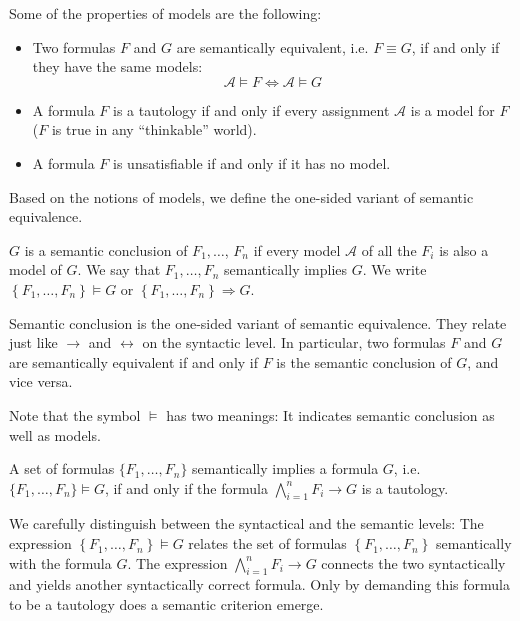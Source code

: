 Some of the properties of models are the following:
\begin{itemize}
  \item Two formulas \(F\) and \(G\) are semantically equivalent, i.e. \(F \equiv G\), if and only if they have the same models: \[\mathcal{A} \models F  \iff  \mathcal{A} \models G\]
  \item A formula \(F\) is a tautology if and only if every assignment \(\mathcal{A}\) is a model for \(F\) (\(F\) is true in any ``thinkable'' world).
  \item A formula \(F\) is unsatisfiable if and only if it has no model.
\end{itemize}

Based on the notions of models, we define the one-sided variant of semantic equivalence.

\begin{definition}\label{def:semantic_conclusion}
$G$ is a semantic conclusion of $F_1, \ldots$, $F_n$ if every model $\mathcal{A}$ of all the $F_i$ is also a model of $G$. We say that $F_1, \ldots, F_n$ semantically implies $G$. We write $\left\{F_1, \ldots, F_n\right\} \vDash G$ or $\left\{F_1, \ldots, F_n\right\} \Rightarrow G$.
\end{definition}

Semantic conclusion is the one-sided variant of semantic equivalence.
They relate just like \(\rightarrow\) and \(\leftrightarrow\) on the syntactic level.
In particular, two formulas $F$ and $G$ are semantically equivalent if and only if $F$ is the semantic conclusion of $G$, and vice versa.

Note that the symbol $\models$ has two meanings: It indicates semantic conclusion as well as models.

\begin{theorem}\label{def:semantic_implication_tautology}
A set of formulas $\{F_1, \ldots, F_n\}$ semantically implies a formula $G$, i.e. $\{F_1, \ldots, F_n\} \models G$, if and only if the formula $\bigwedge_{i=1}^n F_i \rightarrow G$ is a tautology.
\end{theorem}

We carefully distinguish between the syntactical and the semantic levels: The expression $\left\{F_1, \ldots, F_n\right\} \vDash G$ relates the set of formulas $\left\{F_1, \ldots, F_n\right\}$ semantically with the formula $G$. 
The expression $\bigwedge_{i=1}^n F_i \rightarrow G$ connects the two syntactically and yields another syntactically correct formula. 
Only by demanding this formula to be a tautology does a semantic criterion emerge.

